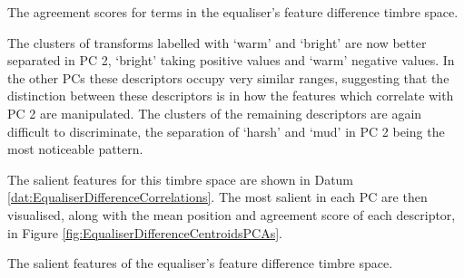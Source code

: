 			\begin{table}[h!]
				\centering
				
				\caption{The agreement scores for terms in the 
					 equaliser's feature difference timbre space.}
				\label{tab:EqualiserDifferenceAgreements}
			\end{table}

			The clusters of transforms labelled with `warm' and `bright' are now better separated in PC 2,
			`bright' taking positive values and `warm' negative values. In the other PCs these descriptors
			occupy very similar ranges, suggesting that the distinction between these descriptors is in how the
			features which correlate with PC 2 are manipulated. The clusters of the remaining descriptors are
			again difficult to discriminate, the separation of `harsh' and `mud' in PC 2 being the most
			noticeable pattern.

			The salient features for this timbre space are shown in Datum
			\ref{dat:EqualiserDifferenceCorrelations}. The most salient in each PC are then visualised, along
			with the mean position and agreement score of each descriptor, in Figure
			\ref{fig:EqualiserDifferenceCentroidsPCAs}. 

			\begin{datum}[h!]
				\centering
				\begin{minipage}{0.9\textwidth}
					
				\end{minipage}
				\caption{The salient features of the equaliser's
					 feature difference timbre space.}
				\label{dat:EqualiserDifferenceCorrelations}
			\end{datum}

